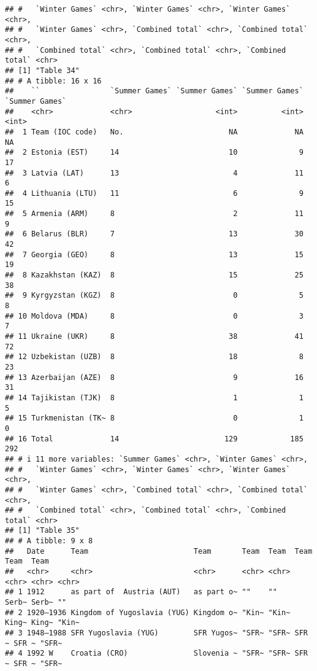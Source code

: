 \documentclass[
]{article}
\begin{document}
\begin{verbatim}
## #   `Winter Games` <chr>, `Winter Games` <chr>, `Winter Games` <chr>,
## #   `Winter Games` <chr>, `Combined total` <chr>, `Combined total` <chr>,
## #   `Combined total` <chr>, `Combined total` <chr>, `Combined total` <chr>
## [1] "Table 34"
## # A tibble: 16 x 16
##    ``                `Summer Games` `Summer Games` `Summer Games` `Summer Games`
##    <chr>             <chr>                   <int>          <int>          <int>
##  1 Team (IOC code)   No.                        NA             NA             NA
##  2 Estonia (EST)     14                         10              9             17
##  3 Latvia (LAT)      13                          4             11              6
##  4 Lithuania (LTU)   11                          6              9             15
##  5 Armenia (ARM)     8                           2             11              9
##  6 Belarus (BLR)     7                          13             30             42
##  7 Georgia (GEO)     8                          13             15             19
##  8 Kazakhstan (KAZ)  8                          15             25             38
##  9 Kyrgyzstan (KGZ)  8                           0              5              8
## 10 Moldova (MDA)     8                           0              3              7
## 11 Ukraine (UKR)     8                          38             41             72
## 12 Uzbekistan (UZB)  8                          18              8             23
## 13 Azerbaijan (AZE)  8                           9             16             31
## 14 Tajikistan (TJK)  8                           1              1              5
## 15 Turkmenistan (TK~ 8                           0              1              0
## 16 Total             14                        129            185            292
## # i 11 more variables: `Summer Games` <chr>, `Winter Games` <chr>,
## #   `Winter Games` <chr>, `Winter Games` <chr>, `Winter Games` <chr>,
## #   `Winter Games` <chr>, `Combined total` <chr>, `Combined total` <chr>,
## #   `Combined total` <chr>, `Combined total` <chr>, `Combined total` <chr>
## [1] "Table 35"
## # A tibble: 9 x 8
##   Date      Team                        Team       Team  Team  Team  Team  Team 
##   <chr>     <chr>                       <chr>      <chr> <chr> <chr> <chr> <chr>
## 1 1912      as part of  Austria (AUT)   as part o~ ""    ""    Serb~ Serb~ ""   
## 2 1920–1936 Kingdom of Yugoslavia (YUG) Kingdom o~ "Kin~ "Kin~ King~ King~ "Kin~
## 3 1948–1988 SFR Yugoslavia (YUG)        SFR Yugos~ "SFR~ "SFR~ SFR ~ SFR ~ "SFR~
## 4 1992 W    Croatia (CRO)               Slovenia ~ "SFR~ "SFR~ SFR ~ SFR ~ "SFR~

\end{verbatim}
\end{document}

